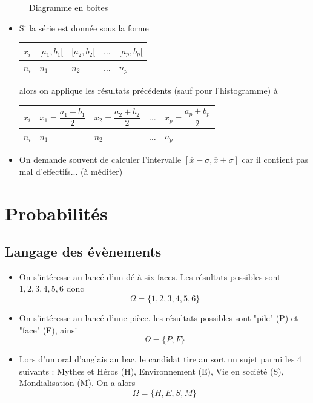 \begin{exemple}
\begin{figure}[H]
\caption{Diagramme en boites}
\end{figure}
\end{exemple}
\begin{remarques}
\begin{itemize}
\item Si la série est donnée sous la forme \newline


\begin{tabularx}{\linewidth}{|X|X|X|X|X|}
\hline
$x_i$ & $[a_1,b_1[$ & $[a_2,b_2[$ & $\ldots$ & $[a_p,b_p[$\\ \hline
$n_i$ & $n_1$ & $n_2$ & $\ldots$ & $n_p$ \\ \hline
\end{tabularx}
alors on applique les résultats précédents (sauf pour l'histogramme) à \newline


\begin{tabularx}{\linewidth}{|X|X|X|X|X|}
\hline
$x_i$ & $x_1=\dfrac{a_1+b_1}{2}$ & $x_2=\dfrac{a_2+b_2}{2}$ & $\ldots$ & $x_p=\dfrac{a_p+b_p}{2}$\\ \hline
$n_i$ & $n_1$ & $n_2$ & $\ldots$ & $n_p$ \\ \hline
\end{tabularx}
\item On demande souvent de calculer l'intervalle $[\overline{x}-\sigma,\overline{x}+\sigma]$ car il contient pas mal d'effectifs... (à méditer)
\end{itemize}
\end{remarques}
\chapter{Probabilités}
\label{chap:proba}
\section{Langage des évènements}
\newline

\begin{exemples}
\begin{itemize}
\item On s'intéresse au lancé d'un dé à six faces. Les résultats possibles sont $1,2,3,4,5,6$ donc $$\Omega = \{1,2,3,4,5,6\}$$
\item On s'intéresse au lancé d'une pièce. les résultats possibles sont "pile" (P) et "face" (F), ainsi $$\Omega = \{P,F\}$$
\item Lors d'un oral d'anglais au bac, le candidat tire au sort un sujet parmi les 4 suivants : Mythes et Héros (H), Environnement (E), Vie en société (S), Mondialisation (M). On a alors $$\Omega = \{H,E,S,M\}$$
\end{itemize}
\end{exemples}
\newline


